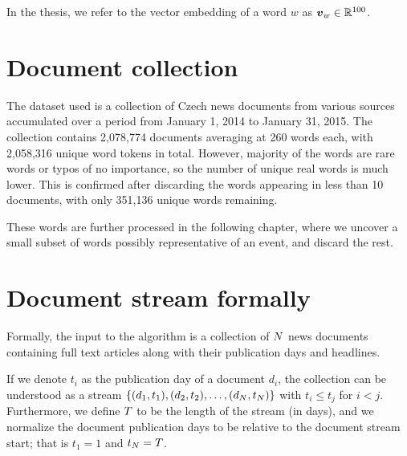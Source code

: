 In the thesis, we refer to the vector embedding of a word $w$ as $\embed_{w} \in \R^{100}$.


\section{Document collection}
The dataset used is a collection of Czech news documents from various sources accumulated over a period from January 1, 2014 to January 31, 2015. The collection contains 2,078,774 documents averaging at 260 words each, with 2,058,316 unique word tokens in total. However, majority of the words are rare words or typos of no importance, so the number of unique real words is much lower. This is confirmed after discarding the words appearing in less than 10 documents, with only 351,136 unique words remaining.

These words are further processed in the following chapter, where we uncover a small subset of words possibly representative of an event, and discard the rest.


\section{Document stream formally}
Formally, the input to the algorithm is a collection of $N$ news documents containing full text articles along with their publication days and headlines.

If we denote $t_{i}$ as the publication day of a document $d_{i}$, the collection can be understood as a stream $\left\{ (d_{1}, t_{1}), (d_{2}, t_{2}), \dots, (d_{N}, t_{N}) \right\}$ with $t_{i} \leq t_{j}$ for $i < j$. Furthermore, we define $T$ to be the length of the stream (in days), and we normalize the document publication days to be relative to the document stream start; that is $t_{1} = 1$ and $t_{N} = T$.